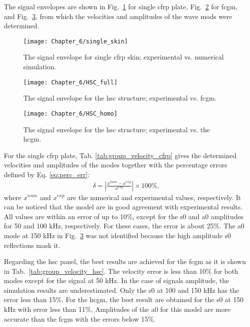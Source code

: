 The signal envelopes are shown in Fig.~\ref{fig:single_skin} for single \ac{cfrp} plate, Fig.~\ref{fig:hsc_full} for \ac{fcgm}, and Fig.~\ref{fig:hsc_homo}, from which the velocities and amplitudes of the wave mods were determined.
\begin{figure}[!htb]
	\begin{center}
		\texttt{[image: Chapter\_6/single\_skin]}
	\end{center}
	\caption{The signal envelope for single \acf{cfrp} skin; experimental vs. numerical simulation.}
	\label{fig:single_skin}
\end{figure}
\begin{figure}[!htb]
	\begin{center}
		\texttt{[image: Chapter\_6/HSC\_full]}
	\end{center}
	\caption{The signal envelope for the \acf{hsc} structure; experimental vs. \acf{fcgm}.}
	\label{fig:hsc_full}
\end{figure}
\begin{figure}[!htb]
	\begin{center}
		\texttt{[image: Chapter\_6/HSC\_homo]}
	\end{center}
	\caption{The signal envelope for the \acf{hsc} structure; experimental vs. the \acf{hcgm}.}
	\label{fig:hsc_homo}
\end{figure}

For the single \ac{cfrp} plate, Tab. \ref{tab:group_velocity_cfrp} gives the determined velocities and amplitudes of the modes together with the percentage errors defined by Eq. \ref{eq:perc_err}:
\begin{eqnarray}
	\delta = \left|\frac{x^{num}-x^{exp}}{x^{exp}}\right|\times100\%,
	\label{eq:perc_err}
\end{eqnarray}
%
where \(x^{num}\) and \(x^{exp}\) are the numerical and experimental values, respectively.
It can be noticed that the model are in good agreement with experimental results.
All values are within an error of up to 10\%, except for the \ac{s0} and \ac{a0} amplitudes for 50 and 100 \unit{\kHz}, respectively.
For these cases, the error is about 25\%.
The \ac{a0} mode at 150 \unit{\kHz} in Fig.~\ref{fig:hsc_homo} was not identified because the high amplitude \ac{s0} reflections mask it.

Regarding the \ac{hsc} panel, the best results are achieved for the \ac{fcgm} as it is shown in Tab.~\ref{tab:group_velocity_hsc}.
The velocity error is less than 10\% for both modes except for the signal at 50 \unit{\kHz}. 
In the case of signals amplitude, the simulation results are underestimated.
Only the \ac{s0} at 100 and 150 \unit{\kHz} has the error less than 15\%.
For the \ac{hcgm}, the best result are obtained for the \ac{s0} at 150 \unit{\kHz} with error less than 11\%.
Amplitudes of the \ac{a0} for this model are more accurate than the \ac{fcgm} with the errors below 15\%.


